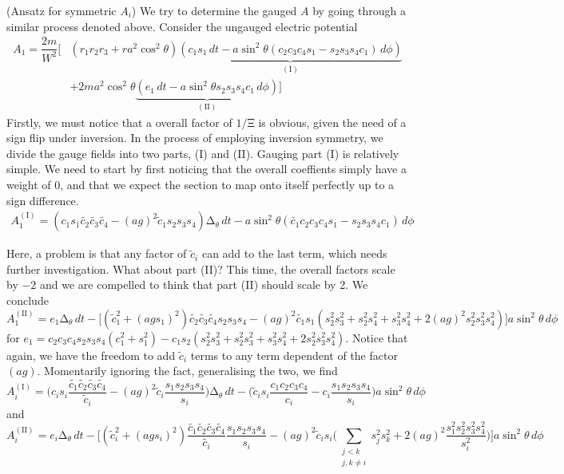 \begin{prop}
(Ansatz for symmetric $A_{i}$) We try to determine the gauged $A$ by going through a similar process denoted above. Consider the ungauged electric potential
\[\begin{align*}
A_1=\dfrac{2m}{W^2}\bigg[&(r_1r_2r_3+ra^2\cos ^2\theta )\underbrace{(c_1s_1\,dt-a\sin ^2\theta (c_2c_3c_4s_1-s_2s_3s_4c_1)\,d\phi )}_{(\mathrm{I})}\\
&+2ma^2\cos ^2\theta \underbrace{(e_1\,dt-a\sin ^2\theta s_2s_3s_4c_1\,d\phi )}_{(\mathrm{II})}\bigg]
\end{align*}\]
Firstly, we must notice that a overall factor of $1/\mathrm{\Xi }$ is obvious, given the need of a sign flip under inversion. In the process of employing inversion symmetry, we divide the gauge fields into two parts, (I) and (II). Gauging part (I) is relatively simple. We need to start by first noticing that the overall coeffients simply have a weight of 0, and that we expect the section to map onto itself perfectly up to a sign difference.  
\[\begin{align*}
A_{1}^{(\mathrm{I})}=(c_1s_1\tilde{c_2}\tilde{c_3}\tilde{c_4}-(ag)^2\tilde{c}_1s_2s_3s_4)\mathrm{\Delta }_{\theta }\,dt-a\sin ^2\theta (\tilde{c_1}c_2c_3c_4s_1-s_2s_3s_4c_1)\,d\phi \end{align*}\]
\end{prop}
\vspace{2ex}
Here, a problem is that any factor of $\tilde{c}_{i}$ can add to the last term, which needs further investigation. What about part (II)? This time, the overall factors scale by $-2$ and we are compelled to think that part (II) should scale by 2. We conclude
\[A^{(\mathrm{II})}_{1}=e_1 \mathrm{\Delta }_{\theta }\,dt-\Big[(\tilde{c}_{1}^2+(ag s_1)^2)\tilde{c_2}\tilde{c_3}\tilde{c_4}s_2s_3s_4-(a g)^2\tilde{c_1}s_1(s_2^2s_3^2+s_2^2s_4^2+s_3^2s_4^2+2(ag)^2s_2^2s_3^2s_4^2)\Big]a\sin ^2\theta \,d\phi \]
for $e_1=c_2 c_3 c_4 s_2 s_3 s_4 (c_1^2+s_1^2)-c_1s_2 (s_2^2 s_3^2+s_2^2 s_3^2+s_3^2 s_4^2+2 s_2^2 s_3^2 s_4^2 )$. Notice that again, we have the freedom to add $\tilde{c}_{i}$ terms to any term dependent of the factor $(ag)$. Momentarily ignoring the fact, generalising the two, we find
\[A_{i}^{(\mathrm{I})}=\Big(c_is_i\dfrac{\tilde{c_1}\tilde{c_2}\tilde{c_3}\tilde{c_4}}{\tilde{c}_{i}}-(ag)^2\tilde{c}_{i}\dfrac{s_1s_2s_3s_4}{s_{i}}\Big)\mathrm{\Delta }_{\theta }\,dt-\Big(\tilde{c}_{i}s_{i}\dfrac{c_1c_2c_3c_4}{c_{i}}-c_i\dfrac{s_1s_2s_3s_4}{s_{i}}\Big)a\sin ^2\theta \,d\phi \]
and
\[A_{i}^{(\mathrm{II})}=e_{i}\mathrm{\Delta }_{\theta }\,dt-\Big[(\tilde{c}_{i}^2+(ags_{i})^2)\dfrac{\tilde{c_1}\tilde{c_2}\tilde{c_3}\tilde{c_4}}{\tilde{c_{i}}}\dfrac{s_1s_2s_3s_4}{s_{i}}-(ag)^2\tilde{c}_{i}s_{i}\Big(\sum _{\substack{j<k\\j,k\ne i}}s_{j}^2s_{k}^2+2(ag)^2\dfrac{s_1^2s_2^2s_3^2s_4^2}{s_{i}^2}\Big)\Big]a\sin ^2\theta \,d\phi \]
